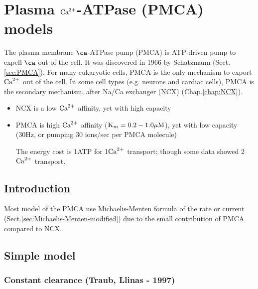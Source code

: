 \chapter{Plasma ${\text{Ca}^{2+}}$-ATPase (PMCA) models}
\label{chap:PMCA}



The plasma membrane $\ca$-ATPase pump (PMCA) is ATP-driven pump to expell $\ca$
out of the cell. It was discovered in 1966 by Schatzmann (Sect.\ref{sec:PMCA}).
For many eukaryotic cells, PMCA is the only mechanism to export ${\text{Ca}^{2+}}$ out of the cell. In some cell
types (e.g. neurons and cardiac cells), PMCA is the secondary mechanism, after
Na/Ca exchanger (NCX) (Chap.\ref{chap:NCX}).
\begin{itemize}
  \item NCX is a low ${\text{Ca}^{2+}}$ affinity, yet with high capacity
  
  \item PMCA is high ${\text{Ca}^{2+}}$ affinity (${\text{K}_m} = 0.2-1.0 {\mu\text{M}}$), yet with low
  capacity (30Hz, or pumping 30 ions/sec per PMCA molecule)
  
The energy cost is 1ATP for 1${\text{Ca}^{2+}}$ transport; though some data showed 2${\text{Ca}^{2+}}$
transport. 
\end{itemize}




\section{Introduction}


Most model of the PMCA use Michaelis-Menten formula of the rate or current
(Sect.\ref{sec:Michaelis-Menten-modified}) due to the small contribution of
PMCA compared to NCX.



\section{Simple model}


\subsection{Constant clearance (Traub, Llinas - 1997)}
\label{sec:PMCA-Traub-Llinas-1997}
\label{sec:PMCA-constant-clearance}

